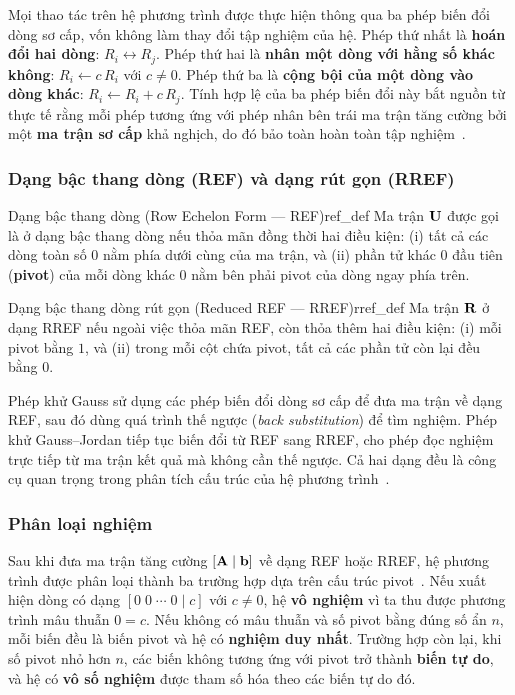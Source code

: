 Mọi thao tác trên hệ phương trình được thực hiện thông qua ba phép biến đổi dòng sơ cấp, vốn không làm thay đổi tập nghiệm của hệ. Phép thứ nhất là \textbf{hoán đổi hai dòng}: $R_i \leftrightarrow R_j$. Phép thứ hai là \textbf{nhân một dòng với hằng số khác không}: $R_i \leftarrow c\,R_i$ với $c \neq 0$. Phép thứ ba là \textbf{cộng bội của một dòng vào dòng khác}: $R_i \leftarrow R_i + c\,R_j$. Tính hợp lệ của ba phép biến đổi này bắt nguồn từ thực tế rằng mỗi phép tương ứng với phép nhân bên trái ma trận tăng cường bởi một \textbf{ma trận sơ cấp} khả nghịch, do đó bảo toàn hoàn toàn tập nghiệm~\cite{golub2013}.

\subsubsection{Dạng bậc thang dòng (REF) và dạng rút gọn (RREF)}

\begin{mydef}{Dạng bậc thang dòng (Row Echelon Form --- REF)}{ref_def}
Ma trận $\mathbf{U}$ được gọi là ở dạng bậc thang dòng nếu thỏa mãn đồng thời hai điều kiện: (i) tất cả các dòng toàn số $0$ nằm phía dưới cùng của ma trận, và (ii) phần tử khác $0$ đầu tiên (\textbf{pivot}) của mỗi dòng khác $0$ nằm bên phải pivot của dòng ngay phía trên.
\end{mydef}

\begin{mydef}{Dạng bậc thang dòng rút gọn (Reduced REF --- RREF)}{rref_def}
Ma trận $\mathbf{R}$ ở dạng RREF nếu ngoài việc thỏa mãn REF, còn thỏa thêm hai điều kiện: (i) mỗi pivot bằng $1$, và (ii) trong mỗi cột chứa pivot, tất cả các phần tử còn lại đều bằng $0$.
\end{mydef}

Phép khử Gauss sử dụng các phép biến đổi dòng sơ cấp để đưa ma trận về dạng REF, sau đó dùng quá trình thế ngược (\textit{back substitution}) để tìm nghiệm. Phép khử Gauss--Jordan tiếp tục biến đổi từ REF sang RREF, cho phép đọc nghiệm trực tiếp từ ma trận kết quả mà không cần thế ngược. Cả hai dạng đều là công cụ quan trọng trong phân tích cấu trúc của hệ phương trình~\cite{strang2023}.

\subsubsection{Phân loại nghiệm}

Sau khi đưa ma trận tăng cường $[\mathbf{A} \mid \mathbf{b}]$ về dạng REF hoặc RREF, hệ phương trình được phân loại thành ba trường hợp dựa trên cấu trúc pivot~\cite{strang2023}. Nếu xuất hiện dòng có dạng $[0\;0\;\cdots\;0 \mid c]$ với $c \neq 0$, hệ \textbf{vô nghiệm} vì ta thu được phương trình mâu thuẫn $0 = c$. Nếu không có mâu thuẫn và số pivot bằng đúng số ẩn $n$, mỗi biến đều là biến pivot và hệ có \textbf{nghiệm duy nhất}. Trường hợp còn lại, khi số pivot nhỏ hơn $n$, các biến không tương ứng với pivot trở thành \textbf{biến tự do}, và hệ có \textbf{vô số nghiệm} được tham số hóa theo các biến tự do đó.

